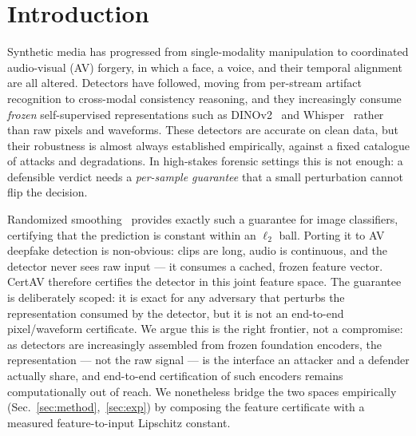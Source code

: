 \section{Introduction}
\label{sec:intro}

Synthetic media has progressed from single-modality manipulation to coordinated audio-visual (AV) forgery, in which a face, a voice, and their temporal alignment are all altered. Detectors have followed, moving from per-stream artifact recognition to cross-modal consistency reasoning, and they increasingly consume \emph{frozen} self-supervised representations such as DINOv2~\cite{oquab2024dinov2} and Whisper~\cite{radford2023whisper} rather than raw pixels and waveforms. These detectors are accurate on clean data, but their robustness is almost always established empirically, against a fixed catalogue of attacks and degradations. In high-stakes forensic settings this is not enough: a defensible verdict needs a \emph{per-sample guarantee} that a small perturbation cannot flip the decision.

Randomized smoothing~\cite{cohen2019certified} provides exactly such a guarantee for image classifiers, certifying that the prediction is constant within an $\ell_2$ ball. Porting it to AV deepfake detection is non-obvious: clips are long, audio is continuous, and the detector never sees raw input --- it consumes a cached, frozen feature vector. CertAV therefore certifies the detector in this joint feature space. The guarantee is deliberately scoped: it is exact for any adversary that perturbs the representation consumed by the detector, but it is not an end-to-end pixel/waveform certificate. We argue this is the right frontier, not a compromise: as detectors are increasingly assembled from frozen foundation encoders, the representation --- not the raw signal --- is the interface an attacker and a defender actually share, and end-to-end certification of such encoders remains computationally out of reach. We nonetheless bridge the two spaces empirically (Sec.~\ref{sec:method},~\ref{sec:exp}) by composing the feature certificate with a measured feature-to-input Lipschitz constant.

